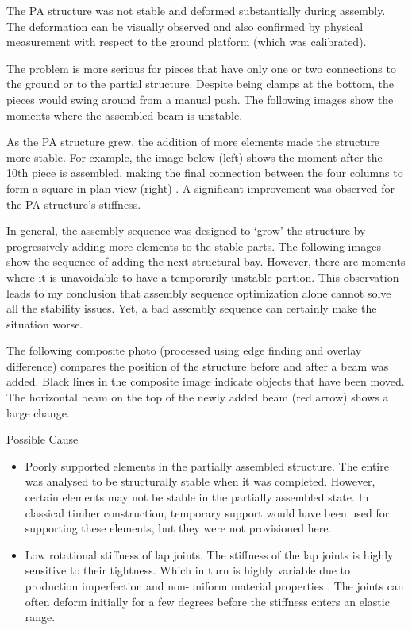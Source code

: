The PA structure was not stable and deformed substantially during assembly. The deformation can be visually observed and also confirmed by physical measurement with respect to the ground platform (which was calibrated).

The problem is more serious for pieces that have only one or two connections to the ground or to the partial structure. Despite being clamps at the bottom, the pieces would swing around from a manual push. The following images show the moments where the assembled beam is unstable.

As the PA structure grew, the addition of more elements made the structure more stable. For example, the image below (left) shows the moment after the 10th piece is assembled, making the final connection between the four columns to form a square in plan view (right) . A significant improvement was observed for the PA structure’s stiffness. 

In general, the assembly sequence was designed to ‘grow’ the structure by progressively adding more elements to the stable parts. The following images show the sequence of adding the next structural bay. However, there are moments where it is unavoidable to have a temporarily unstable portion. This observation leads to my conclusion that assembly sequence optimization alone cannot solve all the stability issues. Yet, a bad assembly sequence can certainly make the situation worse.

The following composite photo (processed using edge finding and overlay difference) compares the position of the structure before and after a beam was added. Black lines in the composite image indicate objects that have been moved. The horizontal beam on the top of the newly added beam (red arrow) shows a large change.

Possible Cause
\begin{itemize}
    \item Poorly supported elements in the partially assembled structure. The entire was analysed to be structurally stable when it was completed. However, certain elements may not be stable in the partially assembled state. In classical timber construction, temporary support would have been used for supporting these elements, but they were not provisioned here.
    \item Low rotational stiffness of lap joints. The stiffness of the lap joints is highly sensitive to their tightness. Which in turn is highly variable due to production imperfection and non-uniform material properties \parencite{qinRotationalBehaviorColumn2018}. The joints can often deform initially for a few degrees before the stiffness enters an elastic range.
\end{itemize}

